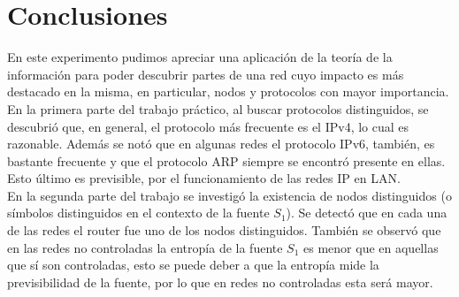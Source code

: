 \section{Conclusiones}
En este experimento pudimos apreciar una aplicación de la teoría de la información para poder descubrir partes de una red cuyo impacto es más destacado en la misma, en particular, nodos y protocolos con mayor importancia.
\\
En la primera parte del trabajo práctico, al buscar protocolos distinguidos, se descubrió que, en general, el protocolo más frecuente es el IPv4, lo cual es razonable. Además se notó que en algunas redes el protocolo IPv6, también, es bastante frecuente y que el protocolo ARP siempre se encontró presente en ellas. Esto último es previsible, por el funcionamiento de las redes IP en LAN.
\\
En la segunda parte del trabajo se investigó la existencia de nodos distinguidos (o símbolos distinguidos en el contexto de la fuente $S_1$). Se detectó que en cada una de las redes el router fue uno de los nodos distinguidos. También se observó que en las redes no controladas la entropía de la fuente $S_1$ es menor que en aquellas que sí son controladas, esto se puede deber a que la entropía mide la previsibilidad de la fuente, por lo que en redes no controladas esta será mayor.

